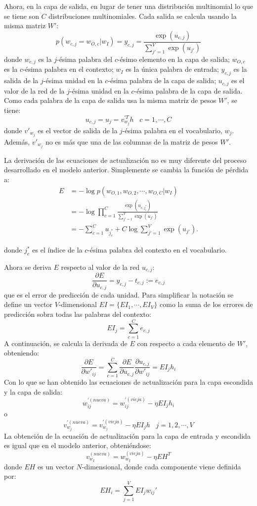 Ahora, en la capa de salida, en lugar de tener una distribución multinomial lo que se tiene son $C$ distribuciones
multinomiales. Cada salida se calcula usando la misma matriz $W'$:
\[
  p\left( w_{c,j} = w_{O,c} | w_I \right) = y_{c,j} = \frac{\exp(u_{c,j})}{\sum_{j'=1}^V\exp(u_{j'})}
\]
donde $w_{c,j}$ es la $j$-ésima palabra del $c$-ésimo elemento en la capa de salida; $w_{O,c}$ es la $c$-ésima
palabra en el contexto; $w_I$ es la única palabra de entrada; $y_{c,j}$ es la salida de la $j$-ésima unidad en la $c$-ésima
palabra de la capa de salida; $u_{c,j}$ es el valor de la red de la $j$-ésima unidad en la $c$-ésima palabra de la capa de salida.
Como cada palabra de la capa de salida usa la misma matriz de pesos $W'$, se tiene:
\[
  u_{c,j} = u_j = v^{'T}_{w_j}h \;\;\; c=1,\cdots, C
\]
donde $v'_{w_j}$ es el vector de salida de la $j$-ésima palabra en el vocabulario, $w_j$. Además, $v'_{w_j}$ no es más que una de las
columnas de la matriz de pesos $W'$.

La derivación de las ecuaciones de actualización no es muy diferente del proceso desarrollado en el modelo anterior. Simplemente se cambia la función de pérdida a:
\begin{equation}\label{perdida_1}
  \begin{align}
  E & = - \log p\left( w_{O,1}, w_{O,2}, \cdots, w_{O,C} | w_I \right) \\
    & = - \log \prod_{c=1}^C \frac{\exp(u_{c,j_c^*})}{\sum_{j'=1}^V\exp(u_{j'})} \\
    & = - \sum_{c=1}^C u_{j^*_c} + C\log \sum_{j'=1}^V\exp(u_{j'}).
  \end{align}
\end{equation}

donde $j_c^*$ es el índice de la $c$-ésima palabra del contexto en el vocabulario.

Ahora se deriva $E$ respecto al valor de la red $u_{c,j}$:
\[
  \frac{\partial E}{\partial u_{c,j}} = y_{c,j} - t_{c,j} := e_{c,j}
\]
que es el error de predicción de cada unidad. Para simplificar la notación se define un vector $V$-dimensional $EI=\{EI_1, \cdots, EI_V\}$ como la suma de los errores de
predicción sobra todas las palabras del contexto:
\[
  EI_j = \sum_{c=1}^C e_{c,j}
\]
A continuación, se calcula la derivada de $E$ con respecto a cada elemento de $W'$, obteniendo:
\[
  \frac{\partial E}{\partial w'_{ij}} = \sum_{c=1}^C \frac{\partial E}{\partial u_{c,j}} \frac{\partial u_{c,j}}{\partial w'_{ij}} = EI_j h_i
\]
Con lo que se han obtenido las ecuaciones de actualización para la capa escondida y la capa de salida:
\[
w_{ij}^{'(nueva)} = w_{ij}^{'(vieja)} - \eta EI_j h_i
\]
o
\[
  v_{w_{j}}^{'(nueva)}= v_{w_j}^{'(vieja)} - \eta EI_j h \;\;\; j = 1,2, \cdots, V
\]
La obtención de la ecuación de actualización para la capa de entrada y escondida es igual que en el modelo anterior, obteniéndose:
\[
  v_{w_I}^{(nueva)} = w_{w_I}^{(vieja)} - \eta EH^T
\]
donde $EH$ es un vector $N$-dimensional, donde cada componente viene definida por:
\[
  EH_i = \sum_{j=1}^V EI_j w_{ij}'
\]


